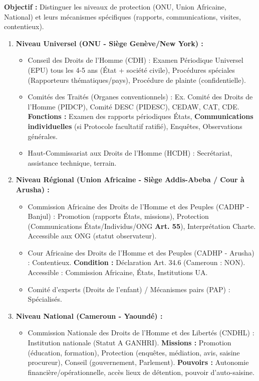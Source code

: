 \documentclass[11pt]{article}
\newcommand{\cle}[1]{{\popxbold\color{popdark}#1}}
\begin{document}
\begin{methode}
    \textbf{Objectif :} Distinguer les niveaux de protection (ONU, Union Africaine, National) et leurs mécanismes spécifiques (rapports, communications, visites, contentieux).
    \begin{enumerate}
        \item \textbf{Niveau Universel (ONU - Siège Genève/New York) :}
            \begin{itemize}
                \item \cle{Conseil des Droits de l'Homme (CDH) :} Examen Périodique Universel (EPU) tous les 4-5 ans (État + société civile), Procédures spéciales (Rapporteurs thématiques/pays), Procédure de plainte (confidentielle).
                \item \cle{Comités des Traités (Organes conventionnels) :} Ex. Comité des Droits de l'Homme (PIDCP), Comité DESC (PIDESC), CEDAW, CAT, CDE. \textbf{Fonctions :} Examen des rapports périodiques États, \textbf{Communications individuelles} (si Protocole facultatif ratifié), Enquêtes, Observations générales.
                \item \cle{Haut-Commissariat aux Droits de l'Homme (HCDH) :} Secrétariat, assistance technique, terrain.
            \end{itemize}
        \item \textbf{Niveau Régional (Union Africaine - Siège Addis-Abeba / Cour à Arusha) :}
            \begin{itemize}
                \item \cle{Commission Africaine des Droits de l'Homme et des Peuples (CADHP - Banjul) :} Promotion (rapports États, missions), Protection (Communications États/Individus/ONG \textbf{Art. 55}), Interprétation Charte. Accessible aux ONG (statut observateur).
                \item \cle{Cour Africaine des Droits de l'Homme et des Peuples (CADHP - Arusha) :} Contentieux. \textbf{Condition :} Déclaration Art. 34.6 (Cameroun : NON). Accessible : Commission Africaine, États, Institutions UA.
                \item \cle{Comité d'experts (Droits de l'enfant) / Mécanismes pairs (PAP) :} Spécialisés.
            \end{itemize}
        \item \textbf{Niveau National (Cameroun - Yaoundé) :}
            \begin{itemize}
                \item \cle{Commission Nationale des Droits de l'Homme et des Libertés (CNDHL) :} Institution nationale (Statut A GANHRI). \textbf{Missions :} Promotion (éducation, formation), Protection (enquêtes, médiation, avis, saisine procureur), Conseil (gouvernement, Parlement). \textbf{Pouvoirs :} Autonomie financière/opérationnelle, accès lieux de détention, pouvoir d'auto-saisine.

\end{itemize}
\end{enumerate}
\end{methode}
\end{document}
